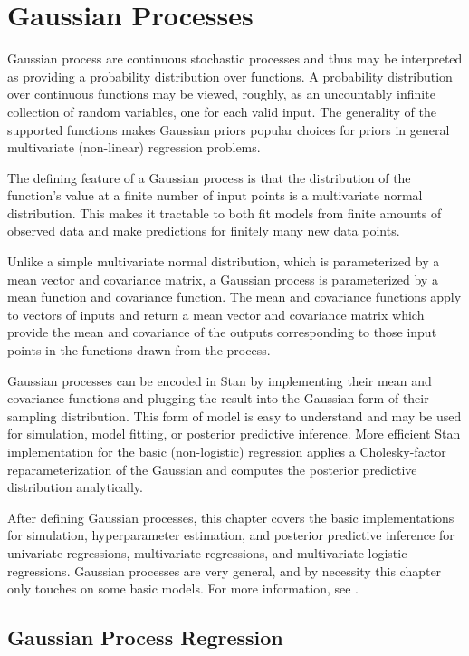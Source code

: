 \chapter{Gaussian Processes}\label{gaussian-processes.chapter}

\noindent
Gaussian process are continuous stochastic processes and thus may be
interpreted as providing a probability distribution over functions.  A
probability distribution over continuous functions may be viewed,
roughly, as an uncountably infinite collection of random variables,
one for each valid input.  The generality of the supported functions
makes Gaussian priors popular choices for priors in general
multivariate (non-linear) regression problems.

The defining feature of a Gaussian process is that the distribution of
the function's value at a finite number of input points is a
multivariate normal distribution.  This makes it tractable to both fit
models from finite amounts of observed data and make predictions for
finitely many new data points. 

Unlike a simple multivariate normal distribution, which is
parameterized by a mean vector and covariance matrix, a Gaussian
process is parameterized by a mean function and covariance function.
The mean and covariance functions apply to vectors of inputs and
return a mean vector and covariance matrix which provide the mean and
covariance of the outputs corresponding to those input points in the
functions drawn from the process.

Gaussian processes can be encoded in Stan by implementing their mean
and covariance functions and plugging the result into the Gaussian
form of their sampling distribution.  This form of model is easy to
understand and may be used for simulation, model fitting, or posterior
predictive inference.  More efficient Stan implementation for the
basic (non-logistic) regression applies a Cholesky-factor
reparameterization of the Gaussian and computes the posterior
predictive distribution analytically.

After defining Gaussian processes, this chapter covers the basic
implementations for simulation, hyperparameter estimation, and
posterior predictive inference for univariate regressions,
multivariate regressions, and multivariate logistic regressions.
Gaussian processes are very general, and by necessity this chapter
only touches on some basic models.  For more information, see
\citep{RasmussenWilliams:2006}.


\section{Gaussian Process Regression}

